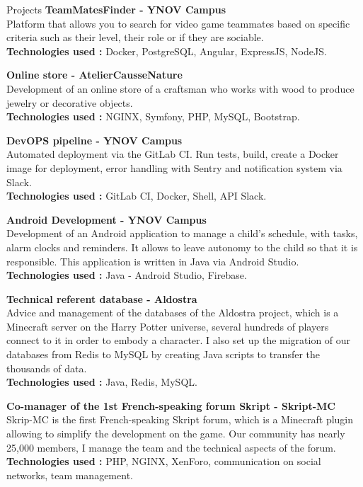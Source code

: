 \documentclass[
	11pt, %
]{resume}
\begin{document}
\begin{rSection}{Projects}
	{\bf TeamMatesFinder - YNOV Campus}
	\\ Platform that allows you to search for video game teammates based on specific criteria such as their level, their role or if they are sociable.
	\\ \textbf{Technologies used :} Docker, PostgreSQL, Angular, ExpressJS, NodeJS.

	{\bf Online store - AtelierCausseNature}
	\\ Development of an online store of a craftsman who works with wood to produce jewelry or decorative objects.
	\\ \textbf{Technologies used :} NGINX, Symfony, PHP, MySQL, Bootstrap.

	{\bf DevOPS pipeline - YNOV Campus}
	\\ Automated deployment via the GitLab CI. Run tests, build, create a Docker image for deployment, error handling with Sentry and notification system via Slack.
	\\ \textbf{Technologies used : }GitLab CI, Docker, Shell, API Slack.

	{\bf Android Development - YNOV Campus}
	\\ Development of an Android application to manage a child’s schedule, with tasks, alarm clocks and reminders. 
	It allows to leave autonomy to the child so that it is responsible. This application is written in Java via Android Studio.
	\\ \textbf{Technologies used :} Java - Android Studio, Firebase.

	{\bf Technical referent database - Aldostra}
	\\ Advice and management of the databases of the Aldostra project, which is a Minecraft server on the Harry Potter universe, several hundreds of players 
	connect to it in order to embody a character. I also set up the migration of our databases from Redis to MySQL by creating Java scripts to transfer the thousands of data.
	\\ \textbf{Technologies used :} Java, Redis, MySQL.

	{\bf Co-manager of the 1st French-speaking forum Skript - Skript-MC}
	\\ Skrip-MC is the first French-speaking Skript forum, which is a Minecraft plugin allowing to simplify the development on the game. 
	Our community has nearly 25,000 members, I manage the team and the technical aspects of the forum.
	\\ \textbf{Technologies used :} PHP, NGINX, XenForo, communication on social networks, team management.


\end{rSection}
\end{document}
